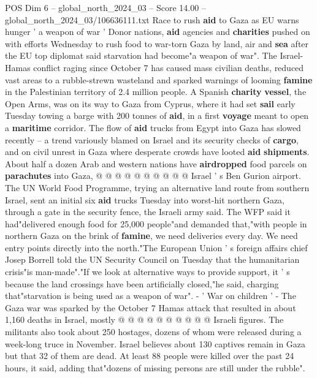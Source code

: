 \begin{textsample}{POS Dim 6 – global\_north\_2024\_03 – Score 14.00 – global\_north\_2024\_03/106636111.txt}  \label{ex:f6_pos_044}
Race to rush \textbf{aid} to Gaza as EU warns hunger ' a weapon of war ' Donor nations, \textbf{aid} agencies and \textbf{charities} pushed on with efforts Wednesday to rush food to war-torn Gaza by land, air and \textbf{sea} after the EU top diplomat said starvation had become"a weapon of war".
The Israel-Hamas conflict raging since October 7 has caused mass civilian deaths, reduced vast areas to a rubble-strewn wasteland and sparked warnings of looming \textbf{famine} in the Palestinian territory of 2.4 million people.
A Spanish \textbf{charity} \textbf{vessel}, the Open Arms, was on its way to Gaza from Cyprus, where it had set \textbf{sail} early Tuesday towing a barge with 200 tonnes of \textbf{aid}, in a first \textbf{voyage} meant to open a \textbf{maritime} corridor.
The flow of \textbf{aid} trucks from Egypt into Gaza has slowed recently -- a trend variously blamed on Israel and its security checks of \textbf{cargo}, and on civil unrest in Gaza where desperate crowds have looted \textbf{aid} \textbf{shipments}.
About half a dozen Arab and western nations have \textbf{airdropped} food parcels on \textbf{parachutes} into Gaza, @ @ @ @ @ @ @ @ @ @ Israel ' s Ben Gurion airport.
The UN World Food Programme, trying an alternative land route from southern Israel, sent an initial six \textbf{aid} trucks Tuesday into worst-hit northern Gaza, through a gate in the security fence, the Israeli army said.
The WFP said it had"delivered enough food for 25,000 people"and demanded that,"with people in northern Gaza on the brink of \textbf{famine}, we need deliveries every day.
We need entry points directly into the north."The European Union ' s foreign affairs chief Josep Borrell told the UN Security Council on Tuesday that the humanitarian crisis"is man-made"."If we look at alternative ways to provide support, it ' s because the land crossings have been artificially closed,"he said, charging that"starvation is being used as a weapon of war". - ' War on children ' - The Gaza war was sparked by the October 7 Hamas attack that resulted in about 1,160 deaths in Israel, mostly @ @ @ @ @ @ @ @ @ @ Israeli figures.
The militants also took about 250 hostages, dozens of whom were released during a week-long truce in November.
Israel believes about 130 captives remain in Gaza but that 32 of them are dead.
At least 88 people were killed over the past 24 hours, it said, adding that"dozens of missing persons are still under the rubble".

\end{textsample}
